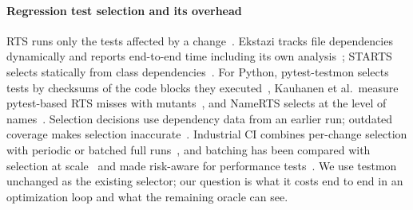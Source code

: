 \paragraph*{Regression test selection and its overhead}
RTS runs only the tests affected by a change~\cite{rothermel1997safe,YooHarman2012}.
Ekstazi tracks file dependencies dynamically and reports end-to-end time including its own analysis~\cite{gligoric2015ekstazi}; STARTS selects statically from class dependencies~\cite{LegunsenShiMarinov2017,legunsen2016static}.
For Python, pytest-testmon selects tests by checksums of the code blocks they executed~\cite{TestmonBlog}, Kauhanen et al.\ measure pytest-based RTS misses with mutants~\cite{KauhanenPytestRTS}, and NameRTS selects at the level of names~\cite{WangPradelLiu2026}.
Selection decisions use dependency data from an earlier run; outdated coverage makes selection inaccurate~\cite{chittimalli2009recomputing}.
Industrial CI combines per-change selection with periodic or batched full runs~\cite{memon2017taming,Elbaum2014}, and batching has been compared with selection at scale~\cite{fallahzadeh2025contrasting} and made risk-aware for performance tests~\cite{sayedsalehi2026riskaware}.
We use testmon unchanged as the existing selector; our question is what it costs end to end in an optimization loop and what the remaining oracle can see.

